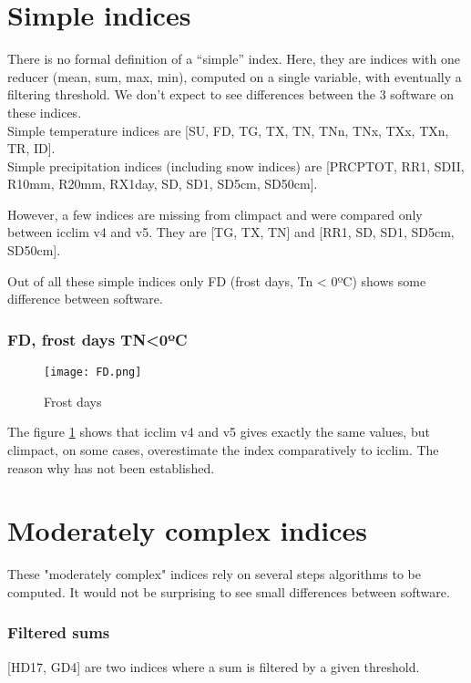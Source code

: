 \documentclass[a4paper,11pt]{article}
\begin{document}
\part{Simple indices}
    There is no formal definition of a “simple” index. Here, they are indices with one reducer (mean, sum, max, min), computed on a single variable, with eventually a filtering threshold. We don't expect to see differences between the 3 software on these indices.\\
    Simple temperature indices are [SU, FD, TG, TX, TN, TNn, TNx, TXx, TXn, TR, ID].\\
    Simple precipitation indices (including snow indices) are [PRCPTOT, RR1, SDII, R10mm, R20mm, RX1day, SD, SD1, SD5cm, SD50cm].

    However, a few indices are missing from climpact and were compared only between icclim v4 and v5. They are [TG, TX, TN] and [RR1, SD, SD1, SD5cm, SD50cm].

    Out of all these simple indices only FD (frost days, Tn < 0ºC) shows some difference between software.

    \section{FD, frost days TN<0ºC}

        \begin{figure}[!hbt]
            \centering
            \texttt{[image: FD.png]}
            \caption{Frost days}
            \label{figure/fd}
        \end{figure}
        
        The figure \ref{figure/fd} shows that icclim v4 and v5 gives exactly the same values, but climpact, on some cases, overestimate the index comparatively to icclim.
        The reason why has not been established.
        

\part{Moderately complex indices}
    These "moderately complex" indices rely on several steps algorithms to be computed.
    It would not be surprising to see small differences between software.

    \section{Filtered sums}
        [HD17, GD4] are two indices where a sum is filtered by a given threshold.
\end{document}

